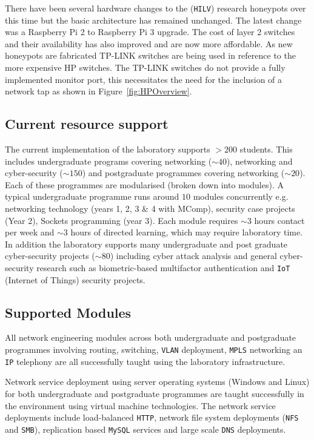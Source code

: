 There have been several hardware changes to the (\texttt{HILV}) research honeypots over this time but the basic architecture has remained unchanged. The latest change was a Raspberry Pi 2 to Raspberry Pi 3 upgrade. The cost of layer 2 switches and their availability has also improved and are now more affordable. As new honeypots are fabricated TP-LINK switches are being used in reference to the more expensive HP switches. The TP-LINK switches do not provide a fully implemented monitor port, this necessitates the need for the inclusion of a network tap as shown in Figure~\ref{fig:HPOverview}.

\subsection{Current resource support}\label{ResourceSupport}
The current implementation of the laboratory supports $>200$ students. This includes undergraduate programs covering networking ($\sim40$), networking and cyber-security ($\sim150$) and postgraduate programmes covering networking ($\sim20$). Each of these programmes are modularised (broken down into modules).  A typical undergraduate programme runs around $10$ modules concurrently e.g. networking technology (years 1, 2, 3 \& 4 with MComp), security case projects (Year 2), Sockets programming (year 3). Each module requires $\sim3$ hours contact per week and $\sim3$ hours of directed learning, which may require laboratory time. In addition the laboratory supports many undergraduate and post graduate cyber-security projects ($\sim80$) including cyber attack analysis and general cyber-security research such as biometric-based multifactor authentication and \texttt{IoT} (Internet of Things) security projects.

\subsection{Supported Modules}\label{Modules}
All network engineering modules across both undergraduate and postgraduate programmes involving routing, switching, \texttt{VLAN} deployment, \texttt{MPLS} networking an \texttt{IP} telephony are all successfully taught using the laboratory infrastructure. 

Network service deployment using server operating systems (Windows and Linux) for both undergraduate and postgraduate programmes are taught successfully in the environment using virtual machine technologies. The network service deployments include load-balanced \texttt{HTTP}, network file system deployments (\texttt{NFS} and \texttt{SMB}), replication based \texttt{MySQL} services and large scale \texttt{DNS} deployments.  

